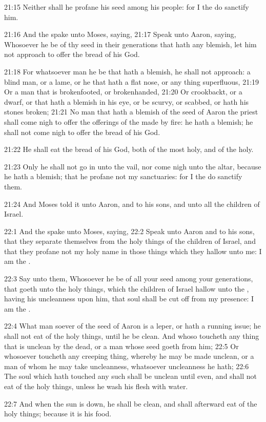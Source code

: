 21:15 Neither shall he profane his seed among his people: for I the
\LORD do sanctify him.

21:16 And the \LORD spake unto Moses, saying, 21:17 Speak unto Aaron,
saying, Whosoever he be of thy seed in their generations that hath any
blemish, let him not approach to offer the bread of his God.

21:18 For whatsoever man he be that hath a blemish, he shall not
approach: a blind man, or a lame, or he that hath a flat nose, or any
thing superfluous, 21:19 Or a man that is brokenfooted, or
brokenhanded, 21:20 Or crookbackt, or a dwarf, or that hath a blemish
in his eye, or be scurvy, or scabbed, or hath his stones broken; 21:21
No man that hath a blemish of the seed of Aaron the priest shall come
nigh to offer the offerings of the \LORD made by fire: he hath a
blemish; he shall not come nigh to offer the bread of his God.

21:22 He shall eat the bread of his God, both of the most holy, and of
the holy.

21:23 Only he shall not go in unto the vail, nor come nigh unto the
altar, because he hath a blemish; that he profane not my sanctuaries:
for I the \LORD do sanctify them.

21:24 And Moses told it unto Aaron, and to his sons, and unto all the
children of Israel.

22:1 And the \LORD spake unto Moses, saying, 22:2 Speak unto Aaron and
to his sons, that they separate themselves from the holy things of the
children of Israel, and that they profane not my holy name in those
things which they hallow unto me: I am the \LORD.

22:3 Say unto them, Whosoever he be of all your seed among your
generations, that goeth unto the holy things, which the children of
Israel hallow unto the \LORD, having his uncleanness upon him, that
soul shall be cut off from my presence: I am the \LORD.

22:4 What man soever of the seed of Aaron is a leper, or hath a
running issue; he shall not eat of the holy things, until he be clean.
And whoso toucheth any thing that is unclean by the dead, or a man
whose seed goeth from him; 22:5 Or whosoever toucheth any creeping
thing, whereby he may be made unclean, or a man of whom he may take
uncleanness, whatsoever uncleanness he hath; 22:6 The soul which hath
touched any such shall be unclean until even, and shall not eat of the
holy things, unless he wash his flesh with water.

22:7 And when the sun is down, he shall be clean, and shall afterward
eat of the holy things; because it is his food.

